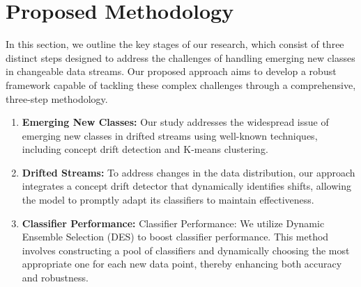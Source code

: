 
\section{Proposed Methodology}
\label{sec:proposed_methodology}
In this section, we outline the key stages of our research, which consist of three distinct steps designed to address the challenges of handling emerging new classes in changeable data streams. Our proposed approach aims to develop a robust framework capable of tackling these complex challenges through a comprehensive, three-step methodology.
\begin{enumerate}
	\item \textbf{Emerging New Classes:} Our study addresses the widespread issue of emerging new classes in drifted streams using well-known techniques, including concept drift detection and K-means clustering.
	\item \textbf{Drifted Streams:} To address changes in the data distribution, our approach integrates a concept drift detector that dynamically identifies shifts, allowing the model to promptly adapt its classifiers to maintain effectiveness.
	\item \textbf{Classifier Performance:} Classifier Performance: We utilize Dynamic Ensemble Selection (DES) to boost classifier performance. This method involves constructing a pool of classifiers and dynamically choosing the most appropriate one for each new data point, thereby enhancing both accuracy and robustness.
\end{enumerate}
